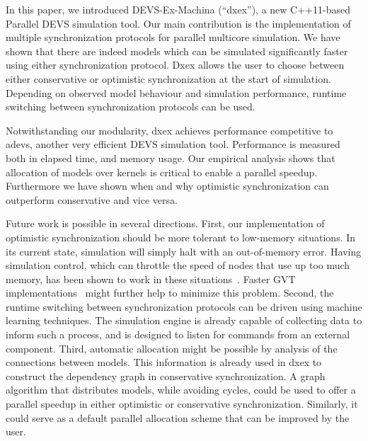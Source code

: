In this paper, we introduced DEVS-Ex-Machina (``dxex''), a new C++11-based \textsf{Parallel DEVS} simulation tool.
Our main contribution is the implementation of multiple synchronization protocols for parallel multicore simulation.
We have shown that there are indeed models which can be simulated significantly faster using either synchronization protocol.
Dxex allows the user to choose between either conservative or optimistic synchronization at the start of simulation.
Depending on observed model behaviour and simulation performance, runtime switching between synchronization protocols can be used.

Notwithstanding our modularity, dxex achieves performance competitive to adevs, another very efficient \textsf{DEVS} simulation tool.
Performance is measured both in elapsed time, and memory usage.
Our empirical analysis shows that allocation of models over kernels is critical to enable a parallel speedup. Furthermore we have shown when and why optimistic synchronization can outperform conservative and vice versa.

Future work is possible in several directions.
First, our implementation of optimistic synchronization should be more tolerant to low-memory situations.
In its current state, simulation will simply halt with an out-of-memory error.
Having simulation control, which can throttle the speed of nodes that use up too much memory, has been shown to work in these situations~\cite{FujimotoBook}.
Faster GVT implementations~\cite{Fujimoto:1997:CGV:268403.268404,Bauer:2005:SND:1069810.1070159} might further help to minimize this problem.
Second, the runtime switching between synchronization protocols can be driven using machine learning techniques.
The simulation engine is already capable of collecting data to inform such a process, and is designed to listen for commands from an external component.
Third, automatic allocation might be possible by analysis of the connections between models.
This information is already used in dxex to construct the dependency graph in conservative synchronization.
A graph algorithm that distributes models, while avoiding cycles, could be used to offer a parallel speedup in either optimistic or conservative synchronization.
Similarly, it could serve as a default parallel allocation scheme that can be improved by the user.
